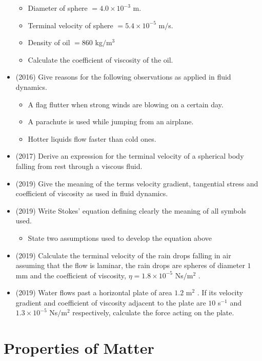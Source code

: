\documentclass{article}
\begin{document}
\begin{itemize}
\begin{itemize}
\item Diameter of sphere $ =4.0 \times 10^{-3}$ m.
\item Terminal velocity of sphere $ =5.4 \times 10^{-5}$ m$/$s.
\item Density of oil $ =860$ kg$/$m$ ^{3}$
\item Calculate the coefficient of viscosity of the oil.
\end{itemize}
\item (2016)  Give reasons for the following observations as applied in fluid dynamics.\begin{itemize}
\item A flag flutter when strong winds are blowing on a certain day.
\item A parachute is used while jumping from an airplane.
\item Hotter liquids flow faster than cold ones.
\end{itemize}
\item (2017)  Derive an expression for the terminal velocity of a spherical body falling  from rest through a viscous fluid. 
\item (2019)  Give the meaning of the terms velocity gradient, tangential stress and coefficient of viscosity as used in fluid dynamics.
\item (2019)  Write Stokes’ equation defining clearly the meaning of all symbols used.\begin{itemize}
\item State two assumptions used to develop the equation above
\end{itemize}
\item (2019)  Calculate the terminal velocity of the rain drops falling in air assuming that the flow is laminar, the rain drops are spheres of diameter $ 1$ mm and the coefficient of viscosity, $ \eta =1.8 \times 10^{-5}$ Ns$/$m$ ^{2}$ . 
\item (2019)  Water flows past a horizontal plate of area $ 1.2$ m$ ^{2}$ . If its velocity gradient and coefficient of viscosity adjacent to the plate are $ 10$ s$ ^{-1}$ and $ 1.3 \times 10^{-5}$ Ns$/$m$ ^{2}$ respectively, calculate the force acting on the plate.  
\end{itemize}


\section{Properties of Matter}
\end{document}

